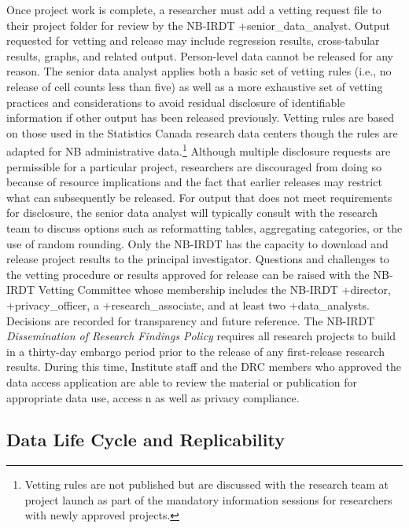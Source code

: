 \documentclass[
]{WileySix}
\begin{document}
Once project work is complete, a researcher must add a vetting request file to their project folder for review by the NB-IRDT +senior\_data\_analyst\textbar. Output requested for vetting and release may include regression results, cross-tabular results, graphs, and related output. Person-level data cannot be released for any reason. The senior data analyst applies both a basic set of vetting rules (i.e., no release of cell counts less than five) as well as a more exhaustive set of vetting practices and considerations to avoid residual disclosure of identifiable information if other output has been released previously. Vetting rules are based on those used in the Statistics Canada research data centers though the rules are adapted for NB administrative data.\footnote{Vetting rules are not published but are discussed with the research team at project launch as part of the mandatory information sessions for researchers with newly approved projects.} Although multiple disclosure requests are permissible for a particular project, researchers are discouraged from doing so because of resource implications and the fact that earlier releases may restrict what can subsequently be released. For output that does not meet requirements for disclosure, the senior data analyst will typically consult with the research team to discuss options such as reformatting tables, aggregating categories, or the use of random rounding. Only the NB-IRDT has the capacity to download and release project results to the principal investigator. Questions and challenges to the vetting procedure or results approved for release can be raised with the NB-IRDT Vetting Committee whose membership includes the NB-IRDT +director\textbar, +privacy\_officer\textbar, a +research\_associate\textbar, and at least two +data\_analysts\textbar. Decisions are recorded for transparency and future reference. The NB-IRDT \emph{Dissemination of Research Findings Policy} requires all research projects to build in a thirty-day embargo period prior to the release of any first-release research results. During this time, Institute staff and the DRC members who approved the data access application are able to review the material or publication for appropriate data use, access n as well as privacy compliance.

\hypertarget{data-life-cycle-and-replicability-1}{%
\subsection{Data Life Cycle and Replicability}\label{data-life-cycle-and-replicability-1}}
\end{document}
